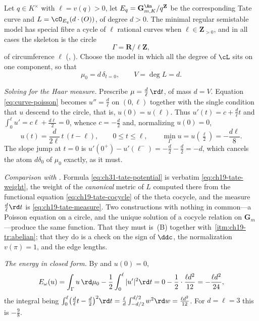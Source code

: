 \begin{example}
\label{ex:ch31-tate-bfj}
Let \(q\in K^\times\) with \(\ell=v(q)>0\), let
\(E_q=\mathbf G_{m,K}^{\An}/q^{\mathbf Z}\) be the corresponding Tate curve
and \(L=\cO_{E_q}(d\cdot(O))\), of degree \(d>0\).  The minimal regular
semistable model has special fibre a cycle of \(\ell\) rational curves when
\(\ell\in\mathbf Z_{>0}\), and in all cases the skeleton is the circle
\[
 \Gamma=\mathbf R/\ell\mathbf Z ,
\]
of circumference \(\ell\) (,
).  Choose the model in which all the degree of
\(\cL\) sits on one component, so that
\[
 \mu_0=d\,\delta_{t=0},\qquad V=\deg L=d .
\]

\emph{Solving for the Haar measure.}  Prescribe
\(\mu=\tfrac d\ell\,\rd t\), of mass \(d=V\).  Equation
\eqref{eq:curve-poisson} becomes \(u''=\tfrac d\ell\) on \((0,\ell)\)
together with the single condition that \(u\) descend to the circle, that
is, \(u(0)=u(\ell)\).  Thus \(u'(t)=c+\tfrac d\ell t\) and
\(\int_0^\ell u'=c\ell+\tfrac{d\ell}{2}=0\), whence \(c=-\tfrac d2\) and,
normalizing \(u(0)=0\),
\begin{equation}
\label{eq:ch31-tate-potential}
 u(t)=\frac{d}{2\ell}\,t\,(t-\ell),
 \qquad 0\leq t\leq\ell,
 \qquad \min_\Gamma u=u(\tfrac\ell2)=-\frac{d\ell}{8} .
\end{equation}
The slope jump at \(t=0\) is
\(u'(0^+)-u'(\ell^-)=-\tfrac d2-\tfrac d2=-d\), which cancels the atom
\(d\delta_0\) of \(\mu_0\) exactly, as it must.

\emph{Comparison with .}  Formula
\eqref{eq:ch31-tate-potential} is verbatim \eqref{eq:ch19-tate-weight}, the
weight of the \emph{canonical} metric of \(L\) computed there from the
functional equation \eqref{eq:ch19-tate-cocycle} of the theta cocycle, and
the measure \(\tfrac d\ell\rd t\) is \eqref{eq:ch19-tate-measure}.  Two
constructions with nothing in common---a Poisson equation on a circle, and
the unique solution of a cocycle relation on \(\mathbf G_m\)---produce the
same function.  That they must is
\,(B) together with
\,\cref{itm:ch19-tr:abelian}; that they do is a
check on the sign of \(\ddc\), the normalization \(v(\pi)=1\), and the edge
lengths.

\emph{The energy in closed form.}  By  and
\(u(0)=0\),
\begin{equation}
\label{eq:ch31-tate-energy}
 E_\omega(u)=\int_\Gamma u\,\rd\mu_0-\frac12\int_0^\ell|u'|^2\rd t
 =0-\frac12\cdot\frac{\ell d^2}{12}
 =-\frac{\ell d^2}{24},
\end{equation}
the integral being
\(\int_0^\ell\bigl(\tfrac d\ell t-\tfrac d2\bigr)^2\rd t
 =\tfrac\ell d\int_{-d/2}^{d/2}w^2\rd w=\tfrac{\ell d^2}{12}\).
For \(d=\ell=3\) this is \(-\tfrac98\).


\end{example}

